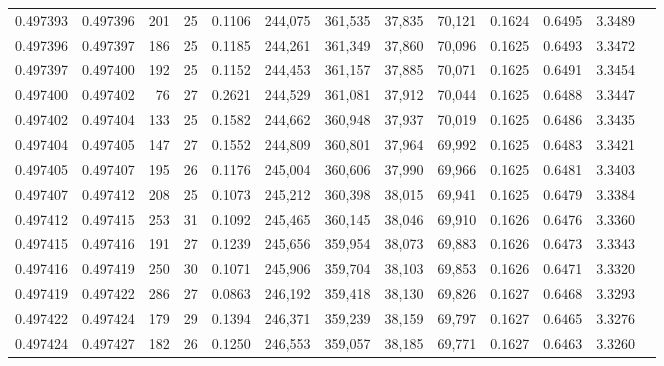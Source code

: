 \begin{tabular}{rrrrrrrrrrrrr}
0.497393 & 0.497396 & 201 &  25 &                                     0.1106 & 244,075 & 361,535 &  37,835 &  70,121 & 0.1624 & 0.6495 & 3.3489 \\
0.497396 & 0.497397 & 186 &  25 &                                     0.1185 & 244,261 & 361,349 &  37,860 &  70,096 & 0.1625 & 0.6493 & 3.3472 \\
0.497397 & 0.497400 & 192 &  25 &                                     0.1152 & 244,453 & 361,157 &  37,885 &  70,071 & 0.1625 & 0.6491 & 3.3454 \\
0.497400 & 0.497402 &  76 &  27 &                                     0.2621 & 244,529 & 361,081 &  37,912 &  70,044 & 0.1625 & 0.6488 & 3.3447 \\
0.497402 & 0.497404 & 133 &  25 &                                     0.1582 & 244,662 & 360,948 &  37,937 &  70,019 & 0.1625 & 0.6486 & 3.3435 \\
0.497404 & 0.497405 & 147 &  27 &                                     0.1552 & 244,809 & 360,801 &  37,964 &  69,992 & 0.1625 & 0.6483 & 3.3421 \\
0.497405 & 0.497407 & 195 &  26 &                                     0.1176 & 245,004 & 360,606 &  37,990 &  69,966 & 0.1625 & 0.6481 & 3.3403 \\
0.497407 & 0.497412 & 208 &  25 &                                     0.1073 & 245,212 & 360,398 &  38,015 &  69,941 & 0.1625 & 0.6479 & 3.3384 \\
0.497412 & 0.497415 & 253 &  31 &                                     0.1092 & 245,465 & 360,145 &  38,046 &  69,910 & 0.1626 & 0.6476 & 3.3360 \\
0.497415 & 0.497416 & 191 &  27 &                                     0.1239 & 245,656 & 359,954 &  38,073 &  69,883 & 0.1626 & 0.6473 & 3.3343 \\
0.497416 & 0.497419 & 250 &  30 &                                     0.1071 & 245,906 & 359,704 &  38,103 &  69,853 & 0.1626 & 0.6471 & 3.3320 \\
0.497419 & 0.497422 & 286 &  27 &                                     0.0863 & 246,192 & 359,418 &  38,130 &  69,826 & 0.1627 & 0.6468 & 3.3293 \\
0.497422 & 0.497424 & 179 &  29 &                                     0.1394 & 246,371 & 359,239 &  38,159 &  69,797 & 0.1627 & 0.6465 & 3.3276 \\
0.497424 & 0.497427 & 182 &  26 &                                     0.1250 & 246,553 & 359,057 &  38,185 &  69,771 & 0.1627 & 0.6463 & 3.3260 \\

\end{tabular}
